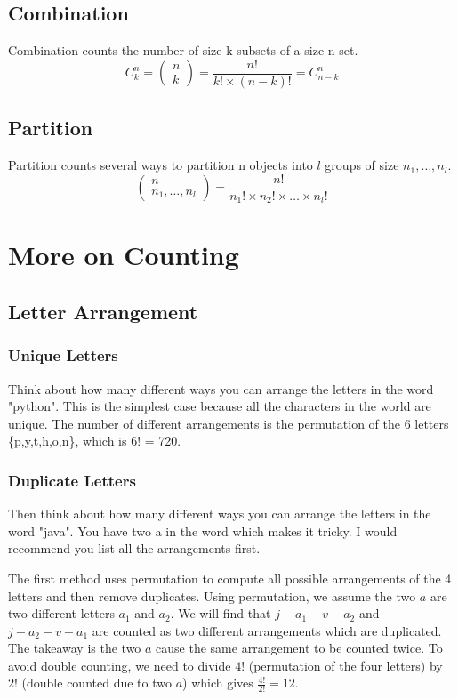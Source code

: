 \documentclass[11pt]{article}
\begin{document}
\subsection{Combination}
Combination counts the number of size k subsets of a size n set.
$$C_k^{n} = \left(\begin{array}{c} n \\ k \end{array}\right) = \frac{n!}{k! \times (n - k)!} = C_{n - k}^n$$

\subsection{Partition}
Partition counts several ways to partition n objects into $l$ groups of size $n_1, \ldots, n_l$.
$$\left( \begin{array}{c} n \\ n_1, \ldots, n_l \end{array} \right) = \frac{n!}{n_1! \times n_2! \times \ldots \times n_l!}$$

\section{More on Counting}
\subsection{Letter Arrangement}
\subsubsection{Unique Letters}
Think about how many different ways you can arrange the letters in the word "python".
This is the simplest case because all the characters in the world are unique. 
The number of different arrangements is the permutation of the 6 letters \{p,y,t,h,o,n\}, which is 6! = 720.

\subsubsection{Duplicate Letters}
Then think about how many different ways you can arrange the letters in the word "java".
You have two a in the word which makes it tricky. I would recommend you list all the arrangements first.

The first method uses permutation to compute all possible arrangements of the 4 letters and then remove duplicates.
Using permutation, we assume the two $a$ are two different letters $a_1$ and $a_2$.
We will find that $j-a_1-v-a_2$ and $j-a_2-v-a_1$ are counted as two different arrangements which are duplicated.
The takeaway is the two $a$ cause the same arrangement to be counted twice. 
To avoid double counting, we need to divide $4!$ (permutation of the four letters) by $2!$ (double counted due to two $a$) which gives $\frac{4!}{2!} = 12$.
\end{document}

